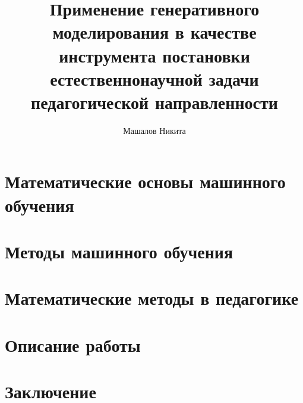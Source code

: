 \documentclass{mipt-thesis-bs}
\title{Применение генеративного моделирования в качестве инструмента постановки естественнонаучной задачи педагогической направленности}
\author{Машалов Никита}
\begin{document}

\tableofcontents

\pagebreak


\chapter{Математические основы машинного обучения}

\chapter{Методы машинного обучения}

\chapter{Математические методы в педагогике}

\chapter{Описание работы}

\chapter{Заключение}


\printbib


\end{document}
